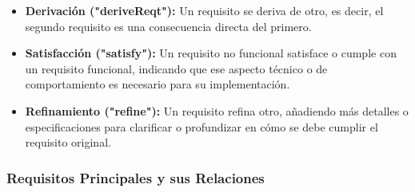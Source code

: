 \documentclass{article}
\begin{document}
\begin{itemize}
	\item \textbf{Derivación ("deriveReqt"):} Un requisito se deriva de otro, es decir, el segundo requisito es una consecuencia directa del primero.
	\item \textbf{Satisfacción ("satisfy"):} Un requisito no funcional satisface o cumple con un requisito funcional, indicando que ese aspecto técnico o de comportamiento es necesario para su implementación.
	\item \textbf{Refinamiento ("refine"):} Un requisito refina otro, añadiendo más detalles o especificaciones para clarificar o profundizar en cómo se debe cumplir el requisito original.
\end{itemize}

\subsubsection{Requisitos Principales y sus Relaciones}
\end{document}
